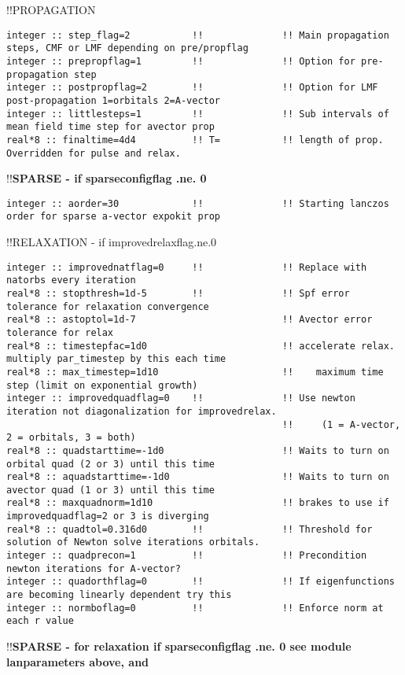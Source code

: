 !!{\large \quad PROPAGATION}
\begin{verbatim}
integer :: step_flag=2           !!              !! Main propagation steps, CMF or LMF depending on pre/propflag
integer :: prepropflag=1         !!              !! Option for pre-propagation step
integer :: postpropflag=2        !!              !! Option for LMF post-propagation 1=orbitals 2=A-vector
integer :: littlesteps=1         !!              !! Sub intervals of mean field time step for avector prop
real*8 :: finaltime=4d4          !! T=           !! length of prop.  Overridden for pulse and relax.  
\end{verbatim}
!!\textbf{\qquad SPARSE - if sparseconfigflag .ne. 0}
\begin{verbatim}
integer :: aorder=30             !!              !! Starting lanczos order for sparse a-vector expokit prop
\end{verbatim}
!!{\large \quad RELAXATION - if improvedrelaxflag.ne.0}
\begin{verbatim}
integer :: improvednatflag=0     !!              !! Replace with natorbs every iteration
real*8 :: stopthresh=1d-5        !!              !! Spf error tolerance for relaxation convergence
real*8 :: astoptol=1d-7                          !! Avector error tolerance for relax
real*8 :: timestepfac=1d0                        !! accelerate relax. multiply par_timestep by this each time
real*8 :: max_timestep=1d10                      !!    maximum time step (limit on exponential growth)
integer :: improvedquadflag=0    !!              !! Use newton iteration not diagonalization for improvedrelax.
                                                 !!     (1 = A-vector, 2 = orbitals, 3 = both)
real*8 :: quadstarttime=-1d0                     !! Waits to turn on orbital quad (2 or 3) until this time
real*8 :: aquadstarttime=-1d0                    !! Waits to turn on avector quad (1 or 3) until this time
real*8 :: maxquadnorm=1d10                       !! brakes to use if improvedquadflag=2 or 3 is diverging
real*8 :: quadtol=0.316d0        !!              !! Threshold for solution of Newton solve iterations orbitals.
integer :: quadprecon=1          !!              !! Precondition newton iterations for A-vector?
integer :: quadorthflag=0        !!              !! If eigenfunctions are becoming linearly dependent try this
integer :: normboflag=0          !!              !! Enforce norm at each r value
\end{verbatim}
!!\textbf{\qquad SPARSE - for relaxation if sparseconfigflag .ne. 0 see module lanparameters above, and}
